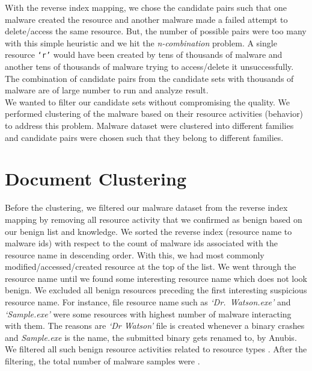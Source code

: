 With the reverse index mapping, we chose the candidate pairs such that one malware created the resource and another malware made a failed attempt to delete/access the same resource.
But, the number of possible pairs were too many with this simple heuristic and we hit the \emph{n-combination} problem.
A single resource \texttt{`r'} would have been created by tens of thousands of malware and another tens of thousands of malware trying to access/delete it unsuccessfully.
The combination of candidate pairs from the candidate sets with thousands of malware are of large number to run and analyze result.\\

We wanted to filter our candidate sets without compromising the quality.
We performed clustering of the malware based on their resource activities (behavior) to address this problem.
Malware dataset were clustered into different families and candidate pairs were chosen such that they belong to different families.
\section{Document Clustering}
\label{sec:Document Clustering}
Before the clustering, we filtered our malware dataset from the reverse index mapping by removing all resource activity that we confirmed as benign based on our benign list and knowledge.
We sorted the reverse index (resource name to malware ids) with respect to the count of malware ids associated with the resource name in descending order.
With this, we had most commonly modified/accessed/created resource at the top of the list.
We went through the resource name until we found some interesting resource name which does not look benign.
We excluded all benign resources preceding the first interesting suspicious resource name.
For instance, file resource name such as \emph{`Dr.\ Watson.exe'} and \emph{`Sample.exe'} were some resources with highest number of malware interacting with them.
The reasons are \emph{`Dr Watson'} file is created whenever a binary crashes and \emph{Sample.exe} is the name, the submitted binary gets renamed to, by Anubis.
We filtered all such benign resource activities related to resource types {\getresourcetypes{}}.
After the filtering, the total number of malware samples were {\gettotalmalwareiii{}}.\\

